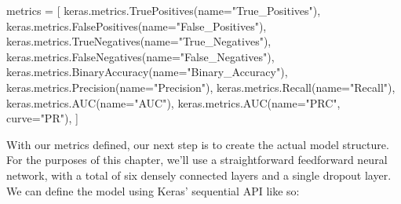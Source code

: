 \documentclass[
  letterpaper,
  DIV=11,
  numbers=noendperiod]{scrartcl}
\newenvironment{Shaded}{\begin{snugshade}}{\end{snugshade}}
\newcommand{\NormalTok}[1]{\textcolor[rgb]{0.00,0.23,0.31}{#1}}
\newcommand{\OperatorTok}[1]{\textcolor[rgb]{0.37,0.37,0.37}{#1}}
\newcommand{\StringTok}[1]{\textcolor[rgb]{0.13,0.47,0.30}{#1}}
\begin{document}
\begin{Shaded}
\begin{Highlighting}[]
\NormalTok{metrics }\OperatorTok{=}\NormalTok{ [}
\NormalTok{    keras.metrics.TruePositives(name}\OperatorTok{=}\StringTok{"True\_Positives"}\NormalTok{),}
\NormalTok{    keras.metrics.FalsePositives(name}\OperatorTok{=}\StringTok{"False\_Positives"}\NormalTok{),}
\NormalTok{    keras.metrics.TrueNegatives(name}\OperatorTok{=}\StringTok{"True\_Negatives"}\NormalTok{),}
\NormalTok{    keras.metrics.FalseNegatives(name}\OperatorTok{=}\StringTok{"False\_Negatives"}\NormalTok{),}
\NormalTok{    keras.metrics.BinaryAccuracy(name}\OperatorTok{=}\StringTok{"Binary\_Accuracy"}\NormalTok{),}
\NormalTok{    keras.metrics.Precision(name}\OperatorTok{=}\StringTok{"Precision"}\NormalTok{),}
\NormalTok{    keras.metrics.Recall(name}\OperatorTok{=}\StringTok{"Recall"}\NormalTok{),}
\NormalTok{    keras.metrics.AUC(name}\OperatorTok{=}\StringTok{"AUC"}\NormalTok{),}
\NormalTok{    keras.metrics.AUC(name}\OperatorTok{=}\StringTok{"PRC"}\NormalTok{, curve}\OperatorTok{=}\StringTok{"PR"}\NormalTok{),}
\NormalTok{]}
\end{Highlighting}
\end{Shaded}

With our metrics defined, our next step is to create the actual model
structure. For the purposes of this chapter, we'll use a straightforward
feedforward neural network, with a total of six densely connected layers
and a single dropout layer. We can define the model using Keras'
sequential API like so:
\end{document}
